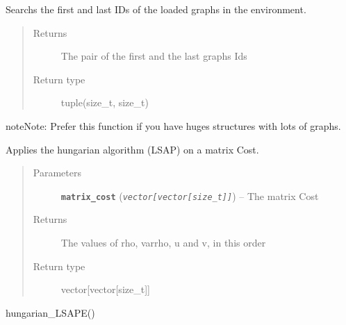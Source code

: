 \documentclass[letterpaper,10pt,english]{sphinxmanual}
\begin{document}
\begin{fulllineitems}
\label{doc:gedlibpy.graph_ids}
Searchs the first and last IDs of the loaded graphs in the environment.
\begin{quote}\begin{description}
\item[{Returns}] \leavevmode
The pair of the first and the last graphs Ids

\item[{Return type}] \leavevmode
tuple(size\_t, size\_t)

\end{description}\end{quote}

\begin{notice}{note}{Note:}
Prefer this function if you have huges structures with lots of graphs.
\end{notice}

\end{fulllineitems}


\begin{fulllineitems}
\label{doc:gedlibpy.hungarian_LSAP}
Applies the hungarian algorithm (LSAP) on a matrix Cost.
\begin{quote}\begin{description}
\item[{Parameters}] \leavevmode
\textbf{\texttt{matrix\_cost}} (\emph{\texttt{vector{[}vector{[}size\_t{]}{]}}}) -- The matrix Cost

\item[{Returns}] \leavevmode
The values of rho, varrho, u and v, in this order

\item[{Return type}] \leavevmode
vector{[}vector{[}size\_t{]}{]}

\end{description}\end{quote}




hungarian\_LSAPE()



\end{fulllineitems}

\end{document}
